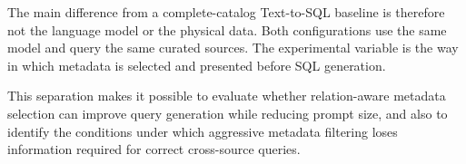 The main difference from a complete-catalog Text-to-SQL baseline is
therefore not the language model or the physical data. Both
configurations use the same model and query the same curated sources.
The experimental variable is the way in which metadata is selected and
presented before SQL generation.

This separation makes it possible to evaluate whether relation-aware
metadata selection can improve query generation while reducing prompt
size, and also to identify the conditions under which aggressive
metadata filtering loses information required for correct cross-source
queries.
